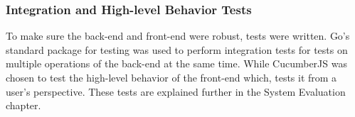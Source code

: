 \subsubsection{Integration and High-level Behavior Tests}
To make sure the back-end and front-end were robust, tests were written. Go's standard package for testing was used to perform integration tests for tests on multiple operations of the back-end at the same time. While CucumberJS was chosen to test the high-level behavior of the front-end which, tests it from a user's perspective. These tests are explained further in the System Evaluation chapter.

